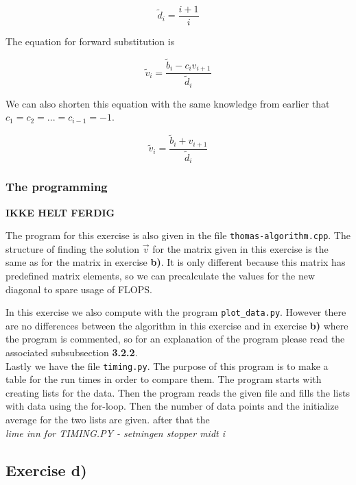 \documentclass{article}
\begin{document}
    \begin{equation*}
      \tilde{d}_i = \frac{i+1}{i}
    \end{equation*}

    The equation for forward substitution is

    \begin{equation*}
      \tilde{v}_i = \frac{\tilde{b}_i - c_i v_{i+1}}{\tilde{d}_i}
    \end{equation*}

    We can also shorten this equation with the same knowledge from earlier that $c_1 = c_2 = ... = c_{i-1} = -1$.

    \begin{equation*}
      \tilde{v}_i = \frac{\tilde{b}_i + v_{i+1}}{\tilde{d}_i}
    \end{equation*}

  \subsubsection{The programming}

  {\large \bf IKKE HELT FERDIG}

    The program for this exercise is also given in the file \texttt{thomas-algorithm.cpp}. The structure of finding the solution $\vec{v}$ for the matrix given in this exercise is the same as for the matrix in exercise \textbf{b)}. It is only different because this matrix has predefined matrix elements, so we can precalculate the values for the new diagonal to spare usage of FLOPS.

    In this exercise we also compute with the program \texttt{plot\_data.py}. However there are no differences between the algorithm in this exercise and in exercise \textbf{b)} where the program is commented, so for an explanation of the program please read the associated subsubsection \textbf{3.2.2}. \\

    Lastly we have the file \texttt{timing.py}. The purpose of this program is to make a table for the run times in order to compare them. The program starts with creating lists for the data. Then the program reads the given file and fills the lists with data using the for-loop. Then the number of data points and the initialize average for the two lists are given. after that the \\


    {\large  \it lime inn for TIMING.PY - setningen stopper midt i}


\subsection{Exercise d)} \label{Method d)}
\end{document}
